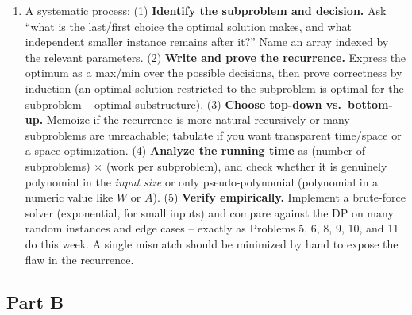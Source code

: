 \documentclass[11pt]{article}
\begin{document}
\begin{enumerate}[label=\textbf{A\arabic*.}, leftmargin=2.2em]
\item A systematic process: (1) \textbf{Identify the subproblem and decision.} Ask ``what
is the last/first choice the optimal solution makes, and what independent smaller instance
remains after it?'' Name an array indexed by the relevant parameters. (2) \textbf{Write and
prove the recurrence.} Express the optimum as a max/min over the possible decisions, then
prove correctness by induction (an optimal solution restricted to the subproblem is optimal
for the subproblem -- optimal substructure). (3) \textbf{Choose top-down vs.\ bottom-up.}
Memoize if the recurrence is more natural recursively or many subproblems are unreachable;
tabulate if you want transparent time/space or a space optimization. (4) \textbf{Analyze
the running time} as (number of subproblems) $\times$ (work per subproblem), and check
whether it is genuinely polynomial in the \emph{input size} or only pseudo-polynomial
(polynomial in a numeric value like $W$ or $A$). (5) \textbf{Verify empirically.} Implement
a brute-force solver (exponential, for small inputs) and compare against the DP on many
random instances and edge cases -- exactly as Problems 5, 6, 8, 9, 10, and 11 do this week.
A single mismatch should be minimized by hand to expose the flaw in the recurrence.

\end{enumerate}

\subsection*{Part B}
\end{document}
